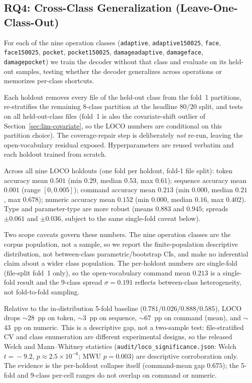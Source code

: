 \documentclass[sensors,article,submit,moreauthors,pdftex]{Definitions/mdpi}
\begin{document}
\subsection{RQ4: Cross-Class Generalization (Leave-One-Class-Out)}
\label{sec:loco}

For each of the nine operation classes (\texttt{adaptive}, \texttt{adaptive150025}, \texttt{face}, \texttt{face150025}, \texttt{pocket}, \texttt{pocket150025}, \texttt{damageadaptive}, \texttt{damageface}, \texttt{damagepocket}) we train the decoder without that class and evaluate on its held-out samples, testing whether the decoder generalizes across operations or memorizes per-class shortcuts.

Each holdout removes every file of the held-out class from the fold~1 partitions, re-stratifies the remaining $8$-class partition at the headline $80/20$ split, and tests on all held-out-class files (fold~1 is also the covariate-shift outlier of Section~\ref{sec:lim-covariate}, so the LOCO numbers are conditional on this partition choice). The coverage-repair step is deliberately \emph{not} re-run, leaving the open-vocabulary residual exposed. Hyperparameters are reused verbatim and each holdout trained from scratch.

Across all nine LOCO holdouts (one fold per holdout, fold-1 file split): token accuracy mean $0.501$ (min $0.29$, median $0.53$, max $0.61$); sequence accuracy mean $0.001$ (range $[0, 0.005]$); command accuracy mean $0.213$ (min $0.000$, median $0.21$, max $0.678$); numeric accuracy mean $0.152$ (min $0.000$, median $0.16$, max $0.402$). Type and parameter-type are more robust (means $0.883$ and $0.945$; spreads $\pm 0.061$ and $\pm 0.036$, subject to the same single-fold caveat below).

Two scope caveats govern these numbers. The nine operation classes are the corpus population, not a sample, so we report the finite-population descriptive distribution, not between-class parametric/bootstrap CIs, and make no inferential claim about a wider class population. The per-holdout numbers are single-fold (file-split fold~1 only), so the open-vocabulary command mean $0.213$ is a single-fold result and the 9-class spread $\sigma = 0.191$ reflects between-class heterogeneity, not fold-to-fold sampling.

Relative to the in-distribution 5-fold baseline ($0.781 / 0.026 / 0.888 / 0.585$), LOCO drops $\sim$$28$~pp on token, $\sim$$3$~pp on sequence, $\sim$$67$~pp on command (mean), and $\sim$$43$~pp on numeric. This is a descriptive gap, not a two-sample test: file-stratified CV and class enumeration are different experimental designs, so the released Welch and Mann--Whitney statistics (\texttt{audit/loco\_significance.json}: Welch $t\!=\!-9.2$, $p\!\approx\!2.5\!\times\!10^{-6}$; MWU $p\!=\!0.003$) are descriptive corroboration only. The evidence is the per-holdout collapse itself (command-mean gap $0.675$); the 5-fold and 9-class per-cell ranges do not overlap on command or numeric.
\end{document}

